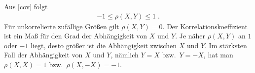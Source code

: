 \documentclass[ngerman,draft,parskip=half,twoside]{scrartcl}
\begin{document}
Aus \autoref{cov} folgt
\begin{gather*}
  -1\le \rho(X,Y)\le 1\;.
\end{gather*}
Für unkorrelierte zufällige Größen gilt $\rho(X,Y)=0$. Der
Korrelationskoeffizient ist ein Maß für den Grad der Abhängigkeit von $X$ und
$Y$. Je näher $\rho(X,Y)$ an $1$ oder $-1$ liegt, desto größer ist die
Abhängigkeit zwischen $X$ und $Y$. Im stärksten Fall der Abhängigkeit von $X$
und $Y$, nämlich $Y=X$ bzw.~$Y=-X$, hat man $\rho(X,X)=1$ bzw.~$\rho(X,-X)=-1$.

\appendix
\clearpage
{}
\printindex
\end{document}
